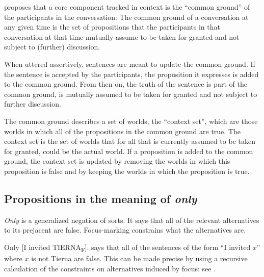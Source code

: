 \cite{stalnaker-1978-Assertion} proposes that a core component tracked in
context is the ``common ground'' of the participants in the conversation: The
common ground of a conversation at any given time is the set of propositions
that the participants in that conversation at that time mutually assume to be
taken for granted and not subject to (further) discussion.

\clearpage
{}%
When uttered assertively, sentences are meant to update the common ground. If
the sentence is accepted by the participants, the proposition it expresses is
added to the common ground. From then on, the truth of the sentence is part of
the common ground, is mutually assumed to be taken for granted and not subject
to further discussion.

\enlargethispage{24pt}%
The common ground describes a set of worlds, the ``context set'', which are
those worlds in which all of the propositions in the common ground are true. The
context set is the set of worlds that for all that is currently assumed to be
taken for granted, could be the actual world. If a proposition is added to the
common ground, the context set is updated by removing the worlds in which this
proposition is false and by keeping the worlds in which the proposition is true.

\subsection{Propositions in the meaning of \emph{only}}
\label{sec:only}

%
\emph{Only} is a generalized negation of sorts. It says that all of the relevant
alternatives to its prejacent are false. Focus-marking constrains what the
alternatives are.

\ex Only [I invited TIERNA\textsubscript{F}]. \xe
%
\Last says that all of the sentences of the form ``I invited \(x\)'' where \(x\)
is not Tierna are false. This can be made precise by using a recursive
calculation of the constraints on alternatives induced by focus: see
\cite{katzir-2007-StructurallyDefinedAlternatives,
  fox-katzir-2011-CharacterizationAlternatives}.

